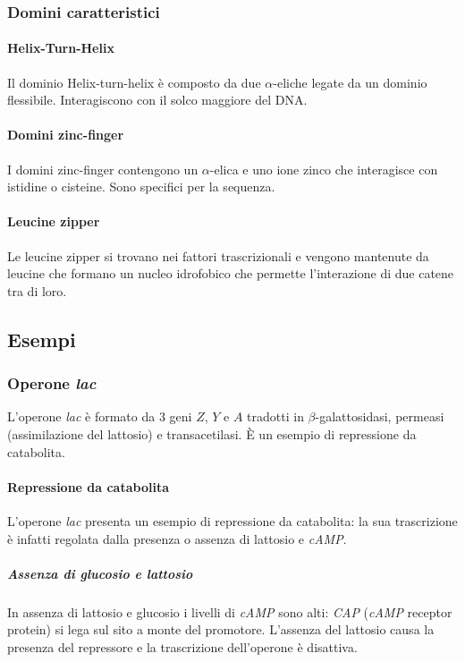		\subsubsection{Domini caratteristici}

			\paragraph{Helix-Turn-Helix}
			Il dominio Helix-turn-helix \`e composto da due $\alpha$-eliche legate da un dominio flessibile.
			Interagiscono con il solco maggiore del DNA.

			\paragraph{Domini zinc-finger}
			I domini zinc-finger contengono un $\alpha$-elica e uno ione zinco che interagisce con istidine o cisteine.
			Sono specifici per la sequenza.

			\paragraph{Leucine zipper}
			Le leucine zipper si trovano nei fattori trascrizionali e vengono mantenute da leucine che formano un nucleo idrofobico che permette l'interazione di due catene tra di loro.

	\subsection{Esempi}

		\subsubsection{Operone \emph{lac}}
		L'operone \emph{lac} \`e formato da $3$ geni $Z$, $Y$ e $A$ tradotti in $\beta$-galattosidasi, permeasi (assimilazione del lattosio) e transacetilasi.
		\`E un esempio di repressione da catabolita.

			\paragraph{Repressione da catabolita}
			L'operone \emph{lac} presenta un esempio di repressione da catabolita: la sua trascrizione \`e infatti regolata dalla presenza o assenza di lattosio e \emph{cAMP}.

				\subparagraph{Assenza di glucosio e lattosio}
				In assenza di lattosio e glucosio i livelli di \emph{cAMP} sono alti: \emph{CAP} (\emph{cAMP} receptor protein) si lega sul sito a monte del promotore.
				L'assenza del lattosio causa la presenza del repressore e la trascrizione dell'operone \`e disattiva.

